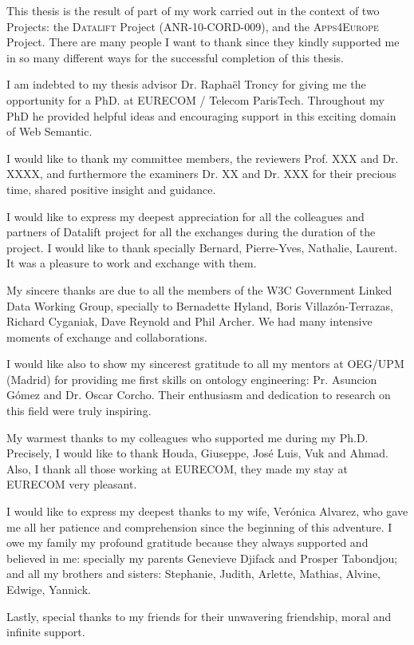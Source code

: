
This thesis is the result of part of my work carried out in the context of two Projects: the \textsc{Datalift} Project (ANR-10-CORD-009), and the \textsc{Apps4Europe} Project. 
There are many people I want to thank since they kindly supported me in so many different ways for the successful completion of this thesis.


I am indebted to my thesis advisor Dr. Rapha\"{e}l Troncy for giving me the opportunity for a PhD. at EURECOM / Telecom ParisTech. Throughout my PhD  he provided helpful ideas and encouraging support in this exciting domain of Web Semantic. 

I would like to thank my committee members, the reviewers Prof. XXX  and Dr. XXXX, and furthermore the examiners Dr. XX and Dr. XXX for their precious time, shared positive insight and guidance.

I would like to express my deepest appreciation for all the colleagues and partners of Datalift project for all the exchanges during the duration of the project. I would like to thank specially Bernard, Pierre-Yves, Nathalie, Laurent. It was a pleasure to work and exchange with them.

My sincere thanks are due to all the members of the W3C Government Linked Data Working Group, specially to Bernadette Hyland, Boris Villaz\'{o}n-Terrazas, Richard Cyganiak, Dave Reynold and Phil Archer. We had many intensive moments of exchange and collaborations.

I would like also to show my sincerest gratitude to all my mentors at OEG/UPM (Madrid) for providing me first skills on ontology engineering: Pr. Asuncion G\'{o}mez and Dr. Oscar Corcho. Their enthusiasm and dedication to research on this field were truly inspiring.


My warmest thanks to my colleagues who supported me during my Ph.D. Precisely, I would like to thank Houda, Giuseppe, Jos\'{e} Luis, Vuk and Ahmad. Also, I thank all those working at EURECOM, they made my stay at EURECOM very pleasant.

I would like to express my deepest thanks to my wife, Ver\'{o}nica Alvarez, who gave me all her patience and comprehension since the beginning of this adventure. 
I owe my family my profound gratitude because they
always supported and believed in me: specially my parents Genevieve Djifack and Prosper Tabondjou; and all my brothers and sisters: Stephanie, Judith, Arlette, Mathias, Alvine, Edwige, Yannick.

Lastly, special thanks to my friends for their unwavering friendship, moral and infinite support.


 


